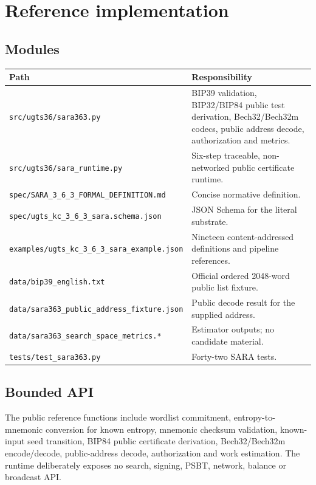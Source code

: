 \documentclass[10pt,a4paper]{article}
\begin{document}
\section{Reference implementation}

\subsection{Modules}
\begin{center}
\small
\begin{tabularx}{0.97\textwidth}{>{\RaggedRight\arraybackslash}p{}X}
\toprule
\textbf{Path} & \textbf{Responsibility}\\
\midrule
\nolinkurl{src/ugts36/sara363.py} & BIP39 validation, BIP32/BIP84 public test derivation, Bech32/Bech32m codecs, public address decode, authorization and metrics.\\
\nolinkurl{src/ugts36/sara_runtime.py} & Six-step traceable, non-networked public certificate runtime.\\
\nolinkurl{spec/SARA_3_6_3_FORMAL_DEFINITION.md} & Concise normative definition.\\
\nolinkurl{spec/ugts_kc_3_6_3_sara.schema.json} & JSON Schema for the literal substrate.\\
\nolinkurl{examples/ugts_kc_3_6_3_sara_example.json} & Nineteen content-addressed definitions and pipeline references.\\
\nolinkurl{data/bip39_english.txt} & Official ordered 2048-word public list fixture.\\
\nolinkurl{data/sara363_public_address_fixture.json} & Public decode result for the supplied address.\\
\nolinkurl{data/sara363_search_space_metrics.*} & Estimator outputs; no candidate material.\\
\nolinkurl{tests/test_sara363.py} & Forty-two SARA tests.\\
\bottomrule
\end{tabularx}
\end{center}

\subsection{Bounded API}
The public reference functions include wordlist commitment, entropy-to-mnemonic conversion for known entropy, mnemonic checksum validation, known-input seed transition, BIP84 public certificate derivation, Bech32/Bech32m encode/decode, public-address decode, authorization and work estimation. The runtime deliberately exposes no search, signing, PSBT, network, balance or broadcast API.
\end{document}
